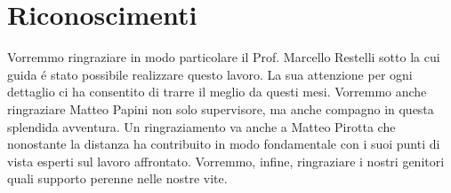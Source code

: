 
\bigskip

\begingroup
\let\clearpage\relax
\let\cleardoublepage\relax
\let\cleardoublepage\relax
\chapter*{Riconoscimenti}
Vorremmo ringraziare in modo particolare il Prof. Marcello Restelli sotto la cui guida \'e stato possibile realizzare questo lavoro. La sua attenzione per ogni dettaglio ci ha consentito di trarre il meglio da questi mesi.\newline
Vorremmo anche ringraziare Matteo Papini non solo supervisore, ma anche compagno in questa splendida avventura.\newline
Un ringraziamento va anche a Matteo Pirotta che nonostante la distanza ha contribuito in modo fondamentale con i suoi punti di vista esperti sul lavoro affrontato.\newline
Vorremmo, infine, ringraziare i nostri genitori quali supporto perenne nelle nostre vite.

\endgroup